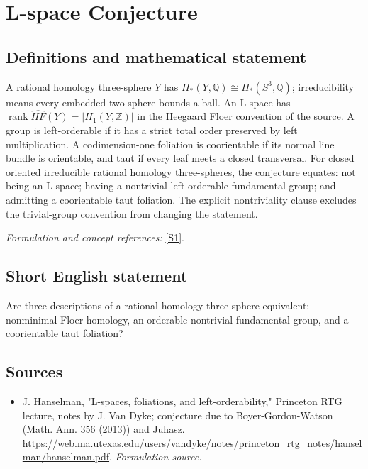 \documentclass[11pt]{article}
\begin{document}
\section*{\texorpdfstring{L-space Conjecture}{L-space Conjecture}}\label{30006775}
\subsection{Definitions and mathematical statement}
A rational homology three-sphere $Y$ has $H_*(Y,{\mathbb{Q}})\cong H_*(S^3,{\mathbb{Q}})$; irreducibility means every embedded two-sphere bounds a ball. An L-space has
$\operatorname{rank}\widehat{HF}(Y)=|H_1(Y,{\mathbb{Z}})|$ in the Heegaard Floer convention of the source. A group is left-orderable if it has a strict total order preserved by left multiplication. A codimension-one foliation is coorientable if its normal line bundle is orientable, and taut if every leaf meets a closed transversal. For closed oriented irreducible rational homology three-spheres, the conjecture equates: not being an L-space; having a nontrivial left-orderable fundamental group; and admitting a coorientable taut foliation. The explicit nontriviality clause excludes the trivial-group convention from changing the statement.
\par\smallskip\textit{Formulation and concept references:} \href{https://web.ma.utexas.edu/users/vandyke/notes/princeton_rtg_notes/hanselman/hanselman.pdf}{[S1]}.

\subsection{Short English statement}
Are three descriptions of a rational homology three-sphere equivalent: nonminimal Floer homology, an orderable nontrivial fundamental group, and a coorientable taut foliation?
\subsection{Sources}
\begin{itemize}
\item[S1]J. Hanselman, "L-spaces, foliations, and left-orderability," Princeton RTG lecture, notes by J. Van Dyke; conjecture due to Boyer-Gordon-Watson (Math. Ann. 356 (2013)) and Juhasz.
\url{https://web.ma.utexas.edu/users/vandyke/notes/princeton_rtg_notes/hanselman/hanselman.pdf}.
\textit{Formulation source.}
\end{itemize}
\end{document}
